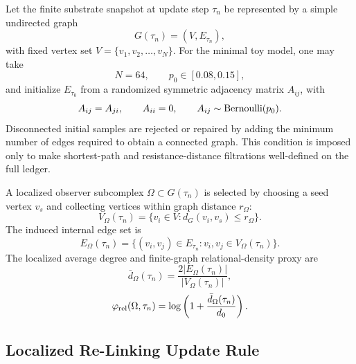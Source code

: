 \documentclass[11pt]{article}
\begin{document}
Let the finite substrate snapshot at update step \(\tau_n\) be represented by a simple undirected graph
\begin{equation}
    G(\tau_n)=(V,E_{\tau_n}),
\end{equation}
with fixed vertex set \(V=\{v_1,v_2,\ldots,v_N\}\). For the minimal toy model, one may take
\begin{equation}
    N=64,\qquad p_0\in[0.08,0.15],
\end{equation}
and initialize \(E_{\tau_0}\) from a randomized symmetric adjacency matrix \(A_{ij}\), with
\begin{equation}
    A_{ij}=A_{ji},\qquad A_{ii}=0,\qquad A_{ij}\sim{\rm Bernoulli}(p_0).
\end{equation}
Disconnected initial samples are rejected or repaired by adding the minimum number of edges required to obtain a connected graph. This condition is imposed only to make shortest-path and resistance-distance filtrations well-defined on the full ledger.

A localized observer subcomplex \(\Omega\subset G(\tau_n)\) is selected by choosing a seed vertex \(v_s\) and collecting vertices within graph distance \(r_\Omega\):
\begin{equation}
    V_\Omega(\tau_n)=\{v_i\in V:d_G(v_i,v_s)\le r_\Omega\}.
\end{equation}
The induced internal edge set is
\begin{equation}
    E_\Omega(\tau_n)=\{(v_i,v_j)\in E_{\tau_n}:v_i,v_j\in V_\Omega(\tau_n)\}.
\end{equation}
The localized average degree and finite-graph relational-density proxy are
\begin{equation}
    \bar d_\Omega(\tau_n)=\frac{2|E_\Omega(\tau_n)|}{|V_\Omega(\tau_n)|},
\end{equation}
\begin{equation}
    \varphi_{\rm rel}(\Omega,\tau_n)=
    \log\left(1+\frac{\bar d_\Omega(\tau_n)}{d_0}\right).
\end{equation}

\subsection{Localized Re-Linking Update Rule}
\end{document}
